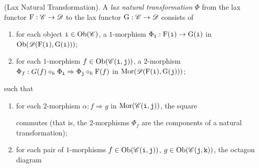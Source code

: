 \noindent\begin{definition}\textup{(Lax Natural Transformation).} A {\em lax natural transformation} $\Phi$ from the lax functor $\textup{F} : \mathscr{C} \to \mathscr{D}$ to the lax functor $\textup{G} : \mathscr{C} \to \mathscr{D}$ consists of
\begin{enumerate}[label=$\bullet$, leftmargin=4\parindent]
\item for each object $\textup{\texttt{i}} \in \textup{Ob}(\mathscr{C})$, a $1$-morphism $\Phi_{\textup{\texttt{i}}} : \textup{F}(\textup{\texttt{i}}) \to \textup{G}(\textup{\texttt{i}})$ in $\textup{Ob}(\mathscr{D}(\textup{F}(\textup{\texttt{i}}), \textup{G}(\textup{\texttt{i}})))$;
\item for each $1$-morphism $f \in \textup{Ob}(\mathscr{C}(\textup{\texttt{i}}, \textup{\texttt{j}}))$, a $2$-morphism $\Phi_f : G(f) \circ_h \Phi_{\textup{\texttt{i}}} \Rightarrow \Phi_{\textup{\texttt{j}}} \circ_h \textup{F}(f)$ %
in $\textup{Mor}(\mathscr{D}(\textup{F}(\textup{\texttt{i}}), \textup{G}(\textup{\texttt{j}})))$;
\end{enumerate}
\noindent such that
\begin{enumerate}[label=$\bullet$, leftmargin=4\parindent]
\item for each $2$-morphism $\alpha : f \Rightarrow g$ in $\textup{Mor}(\mathscr{C}(\textup{\texttt{i}}, \textup{\texttt{j}}))$, the square
\begin{center}
\end{center}
commutes (that is, the $2$-morphisms $\Phi_f$ are the components of a natural transformation);
\item for each pair of $1$-morphisms $f \in \textup{Ob}(\mathscr{C}(\textup{\texttt{i}}, \textup{\texttt{j}}))$, $g \in \textup{Ob}(\mathscr{C}(\textup{\texttt{j}}, \textup{\texttt{k}}))$, the octagon diagram

\end{enumerate}
\end{definition}
